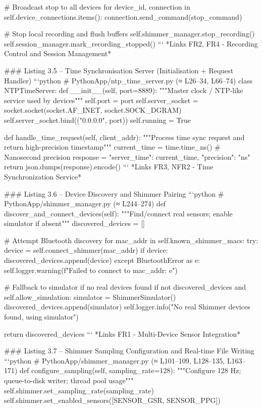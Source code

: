 \documentclass[12pt,a4paper]{article}
\begin{document}
{    # Broadcast stop to all devices
    for device_id, connection in self.device_connections.items():
        connection.send_command(stop_command)
    
    # Stop local recording and flush buffers
    self.shimmer_manager.stop_recording()
    self.session_manager.mark_recording_stopped()
```
*Links FR2, FR4 - Recording Control and Session Management*

### Listing 3.5 – Time Synchronisation Server (Initialisation + Request Handler)
```python
# PythonApp/ntp_time_server.py (≈ L26–34, L66–74)
class NTPTimeServer:
    def __init__(self, port=8889):
        """Master clock / NTP-like service used by devices"""
        self.port = port
        self.server_socket = socket.socket(socket.AF_INET, socket.SOCK_DGRAM)
        self.server_socket.bind(("0.0.0.0", port))
        self.running = True
    
    def handle_time_request(self, client_addr):
        """Process time sync request and return high-precision timestamp"""
        current_time = time.time_ns()  # Nanosecond precision
        response = {"server_time": current_time, "precision": "ns"}
        return json.dumps(response).encode()
```
*Links FR3, NFR2 - Time Synchronization Service*

### Listing 3.6 – Device Discovery and Shimmer Pairing
```python
# PythonApp/shimmer_manager.py (≈ L244–274)
def discover_and_connect_devices(self):
    """Find/connect real sensors; enable simulator if absent"""
    discovered_devices = []
    
    # Attempt Bluetooth discovery
    for mac_addr in self.known_shimmer_macs:
        try:
            device = self.connect_shimmer(mac_addr)
            if device:
                discovered_devices.append(device)
        except BluetoothError as e:
            self.logger.warning(f"Failed to connect to {mac_addr}: {e}")
    
    # Fallback to simulator if no real devices found
    if not discovered_devices and self.allow_simulation:
        simulator = ShimmerSimulator()
        discovered_devices.append(simulator)
        self.logger.info("No real Shimmer devices found, using simulator")
    
    return discovered_devices
```
*Links FR1 - Multi-Device Sensor Integration*

### Listing 3.7 – Shimmer Sampling Configuration and Real-time File Writing
```python
# PythonApp/shimmer_manager.py (≈ L101–109, L128–135, L163–171)
def configure_sampling(self, sampling_rate=128):
    """Configure 128 Hz; queue-to-disk writer; thread pool usage"""
    self.shimmer.set_sampling_rate(sampling_rate)
    self.shimmer.set_enabled_sensors([SENSOR_GSR, SENSOR_PPG])
    
}
\end{document}
